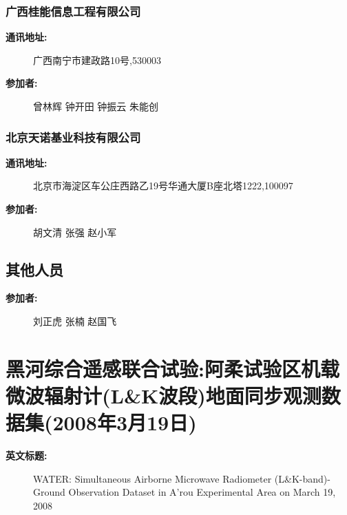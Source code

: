 \documentclass[letterpaper,10pt,english]{sphinxmanual}
\begin{document}
\subsection{广西桂能信息工程有限公司}
\label{water_partner:id32}\begin{description}
\item[{\textbf{通讯地址:}}] \leavevmode
广西南宁市建政路10号,530003

\item[{\textbf{参加者:}}] \leavevmode
曾林辉
钟开田
钟振云
朱能创

\end{description}


\subsection{北京天诺基业科技有限公司}
\label{water_partner:id33}\begin{description}
\item[{\textbf{通讯地址:}}] \leavevmode
北京市海淀区车公庄西路乙19号华通大厦B座北塔1222,100097

\item[{\textbf{参加者:}}] \leavevmode
胡文清
张强
赵小军

\end{description}


\section{其他人员}
\label{water_partner:id34}\begin{description}
\item[{\textbf{参加者:}}] \leavevmode
刘正虎
张楠
赵国飞

\end{description}


\chapter{黑河综合遥感联合试验:阿柔试验区机载微波辐射计(L\&K波段)地面同步观测数据集(2008年3月19日)}
\label{fecd46b0-3390-4580-a415-2d49ba77f9bd:fecd46b0-3390-4580-a415-2d49ba77f9bd}\label{fecd46b0-3390-4580-a415-2d49ba77f9bd:l-k-2008319}\label{fecd46b0-3390-4580-a415-2d49ba77f9bd::doc}\begin{description}
\item[{\textbf{英文标题:}}] \leavevmode
WATER: Simultaneous Airborne Microwave Radiometer (L\&K-band)-Ground Observation Dataset in A'rou Experimental Area on March 19, 2008

\end{description}
\end{document}
